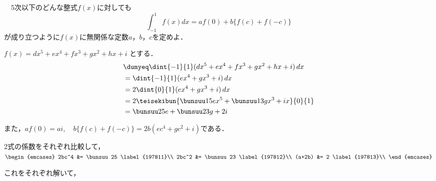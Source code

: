 \begin{problem}
　5次以下のどんな整式$f(x)$に対しても
\[ \int_{-1}^1f(x)dx=af(0)+b\{ f(c)+f(-c) \} \]
が成り立つように$f(x)$に無関係な定数$a$，$b$，$c$を定めよ．
\end{problem}

$f(x) = dx^5 + ex^4 + fx^3 + gx^2 + hx + i$ とする．
\begin{align*}
  &\dumyeq \dint{-1}{1}(dx^5 + ex^4 + fx^3 + gx^2 + hx + i)\,dx\\
  &= \dint{-1}{1} (ex^4 + gx^3 + i) \,dx\\
  &= 2\dint{0}{1} (ex^4 + gx^3 + i) \,dx\\
  &= 2\teisekibun{\bunsuu15 ex^5 + \bunsuu13 gx^3 + ix}{0}{1}\\
  &= \bunsuu25 e + \bunsuu23 g + 2i
\end{align*}

また，$af(0) = ai,\quad b\{f(c) + f(-c)\} = 2b(ec^4 + gc^2 + i)$である．

2式の係数をそれぞれ比較して，
$\begin{emcases}
  2bc^4 &= \bunsuu25 \label{197811}\\
  2bc^2 &= \bunsuu23 \label{197812}\\
  (a+2b) &= 2 \label{197813}\\
\end{emcases}$

これをそれぞれ解いて，
